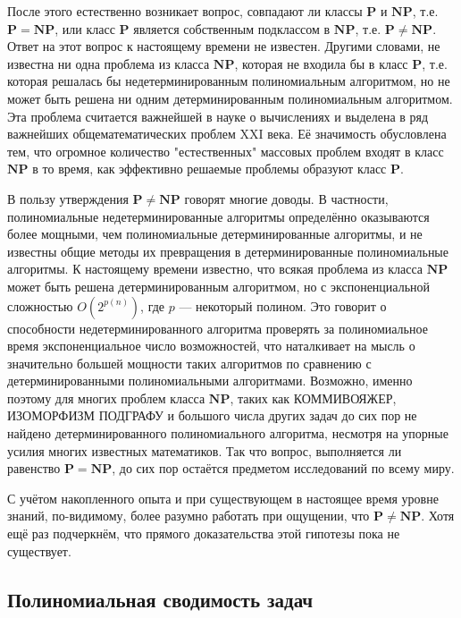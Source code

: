 \documentclass[a4paper,12pt]{article}
\begin{document}
После этого естественно возникает вопрос, совпадают ли классы \(\mathbf{P}\) и \(\mathbf{NP}\), т.е. \(\mathbf{P} = \mathbf{NP}\), или класс \(\mathbf{P}\) является собственным подклассом в \(\mathbf{NP}\), т.е. \(\mathbf{P} \neq \mathbf{NP}\). Ответ на этот вопрос к настоящему времени не известен. Другими словами, не известна ни одна проблема из класса \(\mathbf{NP}\), которая не входила бы в класс \(\mathbf{P}\), т.е. которая решалась бы недетерминированным полиномиальным алгоритмом, но не может быть решена ни одним детерминированным полиномиальным алгоритмом. Эта проблема считается важнейшей в науке о вычислениях и выделена в ряд важнейших общематематических проблем XXI века. Её значимость обусловлена тем, что огромное количество "естественных" массовых проблем входят в класс \(\mathbf{NP}\) в то время, как эффективно решаемые проблемы образуют класс \(\mathbf{P}\).

В пользу утверждения \(\mathbf{P} \neq \mathbf{NP}\) говорят многие доводы. В частности, полиномиальные недетерминированные алгоритмы определённо оказываются более мощными, чем полиномиальные детерминированные алгоритмы, и не известны общие методы их превращения в детерминированные полиномиальные алгоритмы. К настоящему времени известно, что всякая проблема из класса \(\mathbf{NP}\) может быть решена детерминированным алгоритмом, но с экспоненциальной сложностью \(O(2^{p(n)})\), где \(p\) --- некоторый полином. Это говорит о способности недетерминированного алгоритма проверять за полиномиальное время экспоненциальное число возможностей, что наталкивает на мысль о значительно большей мощности таких алгоритмов по сравнению с детерминированными полиномиальными алгоритмами. Возможно, именно поэтому для многих проблем класса \(\mathbf{NP}\), таких как КОММИВОЯЖЕР, ИЗОМОРФИЗМ ПОДГРАФУ и большого числа других задач до сих пор не найдено детерминированного полиномиального алгоритма, несмотря на упорные усилия многих известных математиков. Так что вопрос, выполняется ли равенство \(\mathbf{P} = \mathbf{NP}\), до сих пор остаётся предметом исследований по всему миру.

С учётом накопленного опыта и при существующем в настоящее время уровне знаний, по-видимому, более разумно работать при ощущении, что \(\mathbf{P} \neq \mathbf{NP}\). Хотя ещё раз подчеркнём, что прямого доказательства этой гипотезы пока не существует.

\subsection{Полиномиальная сводимость задач}
\end{document}
